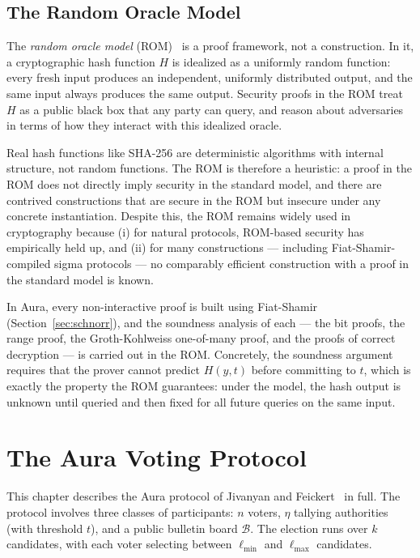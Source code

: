 \documentclass[12pt,a4paper,oneside]{report}
\begin{document}
\section{The Random Oracle Model}
\label{sec:random-oracle}

The \textit{random oracle model} (ROM)~\cite{bellare-rogaway} is a proof 
framework, not a construction. In it, a cryptographic hash function $H$ 
is idealized as a uniformly random function: every fresh input produces 
an independent, uniformly distributed output, and the same input always 
produces the same output. Security proofs in the ROM treat $H$ as a 
public black box that any party can query, and reason about adversaries 
in terms of how they interact with this idealized oracle.

Real hash functions like SHA-256 are deterministic algorithms with 
internal structure, not random functions. The ROM is therefore a 
heuristic: a proof in the ROM does not directly imply security in the 
standard model, and there are contrived constructions that are secure 
in the ROM but insecure under any concrete instantiation. Despite this, 
the ROM remains widely used in cryptography because (i) for natural 
protocols, ROM-based security has empirically held up, and (ii) for 
many constructions --- including Fiat-Shamir-compiled sigma protocols 
--- no comparably efficient construction with a proof in the standard 
model is known.

In Aura, every non-interactive proof is built using Fiat-Shamir 
(Section~\ref{sec:schnorr}), and the soundness analysis of each --- 
the bit proofs, the range proof, the Groth-Kohlweiss one-of-many proof, 
and the proofs of correct decryption --- is carried out in the ROM. 
Concretely, the soundness argument requires that the prover cannot 
predict $H(y, t)$ before committing to $t$, which is exactly the 
property the ROM guarantees: under the model, the hash output is 
unknown until queried and then fixed for all future queries on the 
same input.
\chapter{The Aura Voting Protocol}
\label{ch:aura}

This chapter describes the Aura protocol of Jivanyan and 
Feickert~\cite{aura2022} in full. The protocol involves three classes 
of participants: $n$ voters, $\eta$ tallying authorities (with threshold 
$t$), and a public bulletin board $\mathcal{B}$. The election runs over 
$k$ candidates, with each voter selecting between $\ell_{\min}$ and 
$\ell_{\max}$ candidates.
\end{document}
